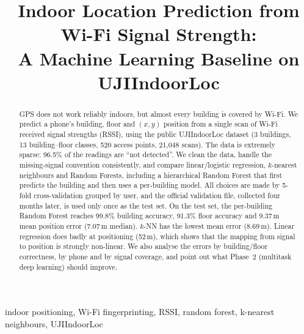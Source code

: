 \documentclass[conference]{IEEEtran}
\begin{document}
\title{Indoor Location Prediction from Wi-Fi Signal Strength:\\ A Machine Learning Baseline on UJIIndoorLoc}

\author{
}

\maketitle

\begin{abstract}
GPS does not work reliably indoors, but almost every building is covered by Wi-Fi. We predict a
phone's building, floor and $(x,y)$ position from a single scan of Wi-Fi received signal strengths
(RSSI), using the public UJIIndoorLoc dataset (3 buildings, 13 building--floor classes, 520 access
points, 21{,}048 scans). The data is extremely sparse: 96.5\% of the readings are ``not detected''.
We clean the data, handle the missing-signal convention consistently, and compare
linear/logistic regression, $k$-nearest neighbours and Random Forests, including a hierarchical
Random Forest that first predicts the building and then uses a per-building model. All choices are made by
5-fold cross-validation grouped by user, and the official validation file, collected four months
later, is used only once as the test set. On the test set, the per-building Random Forest reaches 99.8\% building accuracy, 91.3\% floor accuracy and 9.37\,m
mean position error (7.07\,m median). $k$-NN has the lowest mean error (8.69\,m). Linear regression does badly at
positioning (52\,m), which shows that the mapping from signal to position is strongly non-linear.
We also analyse the errors by building/floor correctness, by phone and by signal coverage, and point out
what Phase~2 (multitask deep learning) should improve.
\end{abstract}

\begin{IEEEkeywords}
indoor positioning, Wi-Fi fingerprinting, RSSI, random forest, k-nearest neighbours, UJIIndoorLoc
\end{IEEEkeywords}
\end{document}
